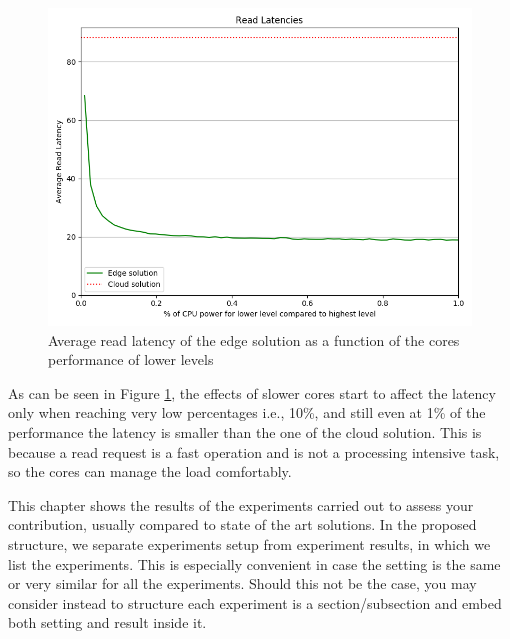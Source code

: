 \begin{figure}[H]
    \centering
    \includegraphics[width=0.95\linewidth]{Figures/Evaluation/read-district-cpu-latency.png}
    \caption{Average read latency of the edge solution as a function of the cores performance of lower levels}
    \label{fig:/read-district-cpu-latency}
\end{figure}

As can be seen in Figure \ref{fig:/read-district-cpu-latency}, the effects of slower cores start to affect the latency only when reaching very low percentages i.e., 10\%, and still even at 1\% of the performance the latency is smaller than the one of the cloud solution. This is because a read request is a fast operation and is not a processing intensive task, so the cores can manage the load comfortably.





















\iffalse
This chapter shows the results of the experiments carried out to assess your contribution, usually compared to state of the art solutions. In the proposed structure, we separate experiments setup from experiment results, in which we list the experiments. This is especially convenient in case the setting is the same or very similar for all the experiments. Should this not be the case, you may consider instead to structure each experiment is a section/subsection and embed both setting and result inside it.

